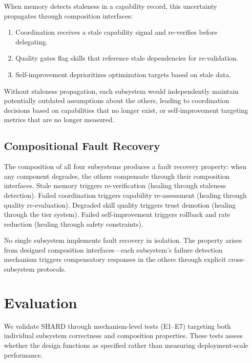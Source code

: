 \documentclass[11pt]{article}
\begin{document}
When memory detects staleness in a capability record, this uncertainty propagates through composition interfaces:

\begin{enumerate}[nosep]
\item Coordination receives a stale capability signal and re-verifies before delegating.
\item Quality gates flag skills that reference stale dependencies for re-validation.
\item Self-improvement deprioritizes optimization targets based on stale data.
\end{enumerate}

Without staleness propagation, each subsystem would independently maintain potentially outdated assumptions about the others, leading to coordination decisions based on capabilities that no longer exist, or self-improvement targeting metrics that are no longer measured.

\subsection{Compositional Fault Recovery}

The composition of all four subsystems produces a fault recovery property: when any component degrades, the others compensate through their composition interfaces. Stale memory triggers re-verification (healing through staleness detection). Failed coordination triggers capability re-assessment (healing through quality re-evaluation). Degraded skill quality triggers trust demotion (healing through the tier system). Failed self-improvement triggers rollback and rate reduction (healing through safety constraints).

No single subsystem implements fault recovery in isolation. The property arises from designed composition interfaces---each subsystem's failure detection mechanism triggers compensatory responses in the others through explicit cross-subsystem protocols.

\section{Evaluation}

We validate SHARD through mechanism-level tests (E1--E7) targeting both individual subsystem correctness and composition properties. These tests assess whether the design functions as specified rather than measuring deployment-scale performance.
\end{document}
